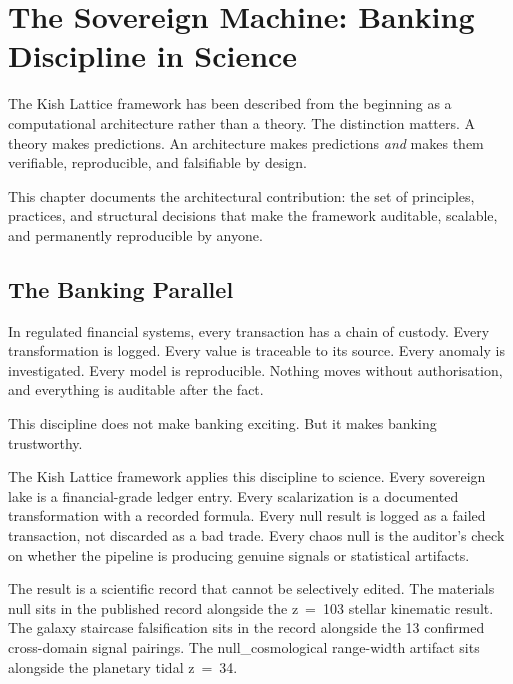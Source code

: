 \documentclass[11pt, letterpaper, openany]{book}
\begin{document}
\chapter{The Sovereign Machine: Banking Discipline in Science}

The Kish Lattice framework has been described from the beginning as a computational
architecture rather than a theory. The distinction matters. A theory makes predictions.
An architecture makes predictions \emph{and} makes them verifiable, reproducible,
and falsifiable by design.

This chapter documents the architectural contribution: the set of principles, practices,
and structural decisions that make the framework auditable, scalable, and permanently
reproducible by anyone.

\section*{The Banking Parallel}

In regulated financial systems, every transaction has a chain of custody. Every
transformation is logged. Every value is traceable to its source. Every anomaly is
investigated. Every model is reproducible. Nothing moves without authorisation, and
everything is auditable after the fact.

This discipline does not make banking exciting. But it makes banking trustworthy.

The Kish Lattice framework applies this discipline to science. Every sovereign lake
is a financial-grade ledger entry. Every scalarization is a documented transformation
with a recorded formula. Every null result is logged as a failed transaction, not
discarded as a bad trade. Every chaos null is the auditor's check on whether the
pipeline is producing genuine signals or statistical artifacts.

The result is a scientific record that cannot be selectively edited. The materials null
sits in the published record alongside the z~=~103 stellar kinematic result. The
galaxy staircase falsification sits in the record alongside the 13 confirmed
cross-domain signal pairings. The null\_cosmological range-width artifact sits alongside
the planetary tidal z~=~34.
\end{document}
